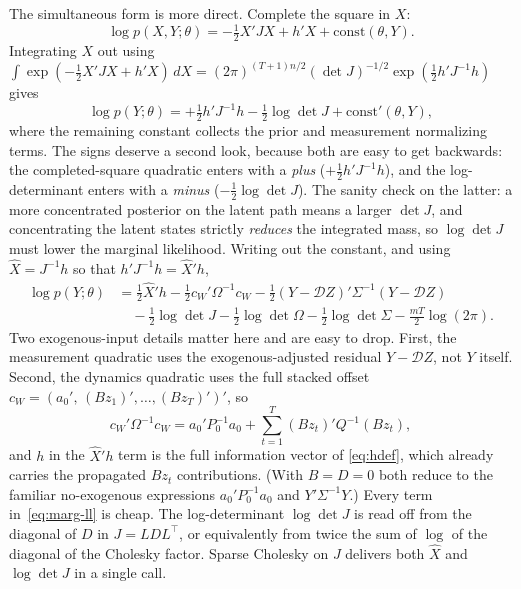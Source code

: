 \documentclass[11pt]{article}
\begin{document}
The simultaneous form is more direct.  Complete the square in $X$:
\begin{equation}
\log p(X,Y;\theta)
=-\tfrac12 X'JX+h'X+\text{const}(\theta,Y).
\end{equation}
Integrating $X$ out using
$\int\exp(-\tfrac12X'JX+h'X)\,dX
=(2\pi)^{(T+1)n/2}(\det J)^{-1/2}\exp(\tfrac12h'J^{-1}h)$ gives
\begin{equation}
\log p(Y;\theta)
=+\tfrac12 h'J^{-1}h-\tfrac12 \log\det J + \text{const}'(\theta,Y),
\label{eq:marg-ll-integrated}
\end{equation}
where the remaining constant collects the prior and measurement
normalizing terms.  The signs deserve a second look, because both are
easy to get backwards: the completed-square quadratic enters with a
\emph{plus} ($+\tfrac12h'J^{-1}h$), and the log-determinant enters with
a \emph{minus} ($-\tfrac12\log\det J$).  The sanity check on the
latter: a more concentrated posterior on the latent path means a larger
$\det J$, and concentrating the latent states strictly \emph{reduces}
the integrated mass, so $\log\det J$ must lower the marginal
likelihood.  Writing out the constant, and using
$\widehat X=J^{-1}h$ so that $h'J^{-1}h=\widehat X'h$,
\begin{align}
\log p(Y;\theta)
&=\tfrac12 \widehat X'h
 -\tfrac12 c_W'\Omega^{-1}c_W
 -\tfrac12 (Y-\mathcal DZ)'\Sigma^{-1}(Y-\mathcal DZ) \nonumber\\
&\quad -\tfrac12 \log\det J
 -\tfrac12 \log\det\Omega
 -\tfrac12 \log\det\Sigma
 -\tfrac{mT}{2}\log(2\pi).
\label{eq:marg-ll}
\end{align}
Two exogenous-input details matter here and are easy to drop.  First,
the measurement quadratic uses the exogenous-adjusted residual
$Y-\mathcal DZ$, not $Y$ itself.  Second, the dynamics quadratic uses
the full stacked offset $c_W=(a_0',\,(Bz_1)',\ldots,(Bz_T)')'$, so
\begin{equation}
c_W'\Omega^{-1}c_W
=a_0'P_0^{-1}a_0+\sum_{t=1}^T (Bz_t)'Q^{-1}(Bz_t),
\end{equation}
and $h$ in the $\widehat X'h$ term is the full information vector of
\eqref{eq:hdef}, which already carries the propagated $Bz_t$
contributions.  (With $B=D=0$ both reduce to the familiar
no-exogenous expressions $a_0'P_0^{-1}a_0$ and $Y'\Sigma^{-1}Y$.)
Every term in~\eqref{eq:marg-ll} is cheap.  The log-determinant
$\log\det J$ is read off from the diagonal of $D$ in $J=LDL^\top$,
or equivalently from twice the sum of $\log$ of the diagonal of the
Cholesky factor.  Sparse Cholesky on $J$ delivers both $\widehat X$ and
$\log\det J$ in a single call.
\end{document}
